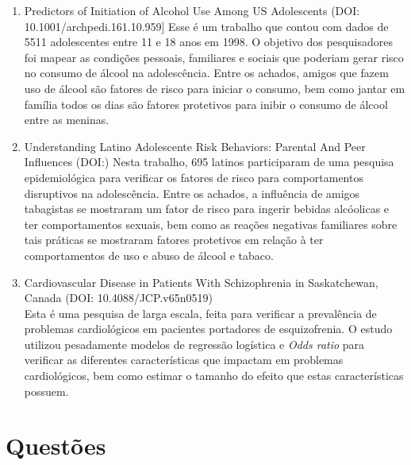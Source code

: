 \documentclass[
]{book}
\begin{document}
\begin{enumerate}
\def\labelenumi{\arabic{enumi}.}
\item
  Predictors of Initiation of Alcohol Use Among US Adolescents (DOI: 10.1001/archpedi.161.10.959{]}
  Esse é um trabalho que contou com dados de 5511 adolescentes entre 11 e 18 anos em 1998. O objetivo dos pesquisadores foi mapear as condições pessoais, familiares e sociais que poderiam gerar risco no consumo de álcool na adolescência. Entre os achados, amigos que fazem uso de álcool são fatores de risco para iniciar o consumo, bem como jantar em família todos os dias são fatores protetivos para inibir o consumo de álcool entre as meninas.
\item
  Understanding Latino Adolescente Risk Behaviors: Parental And Peer Influences (DOI:)
  Nesta trabalho, 695 latinos participaram de uma pesquisa epidemiológica para verificar os fatores de risco para comportamentos disruptivos na adolescência. Entre os achados, a influência de amigos tabagistas se mostraram um fator de risco para ingerir bebidas alcóolicas e ter comportamentos sexuais, bem como as reações negativas familiares sobre tais práticas se mostraram fatores protetivos em relação à ter comportamentos de uso e abuso de álcool e tabaco.
\item
  Cardiovascular Disease in Patients With Schizophrenia in Saskatchewan, Canada (DOI: 10.4088/JCP.v65n0519)\\
  Esta é uma pesquisa de larga escala, feita para verificar a prevalência de problemas cardiológicos em pacientes portadores de esquizofrenia. O estudo utilizou pesadamente modelos de regressão logística e \emph{Odds ratio} para verificar as diferentes características que impactam em problemas cardiológicos, bem como estimar o tamanho do efeito que estas características possuem.
\end{enumerate}

\hypertarget{questuxf5es-4}{%
\section{Questões}\label{questuxf5es-4}}
\end{document}
